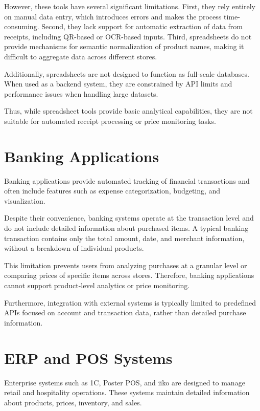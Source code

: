 However, these tools have several significant limitations. First, they rely entirely on manual data entry, which introduces errors and makes the process time-consuming. Second, they lack support for automatic extraction of data from receipts, including QR-based or OCR-based inputs. Third, spreadsheets do not provide mechanisms for semantic normalization of product names, making it difficult to aggregate data across different stores.

Additionally, spreadsheets are not designed to function as full-scale databases. When used as a backend system, they are constrained by API limits and performance issues when handling large datasets.

Thus, while spreadsheet tools provide basic analytical capabilities, they are not suitable for automated receipt processing or price monitoring tasks.

\section{Banking Applications}

Banking applications provide automated tracking of financial transactions and often include features such as expense categorization, budgeting, and visualization.

Despite their convenience, banking systems operate at the transaction level and do not include detailed information about purchased items. A typical banking transaction contains only the total amount, date, and merchant information, without a breakdown of individual products.

This limitation prevents users from analyzing purchases at a granular level or comparing prices of specific items across stores. Therefore, banking applications cannot support product-level analytics or price monitoring.

Furthermore, integration with external systems is typically limited to predefined APIs focused on account and transaction data, rather than detailed purchase information.

\section{ERP and POS Systems}

Enterprise systems such as 1C, Poster POS, and iiko are designed to manage retail and hospitality operations. These systems maintain detailed information about products, prices, inventory, and sales.

